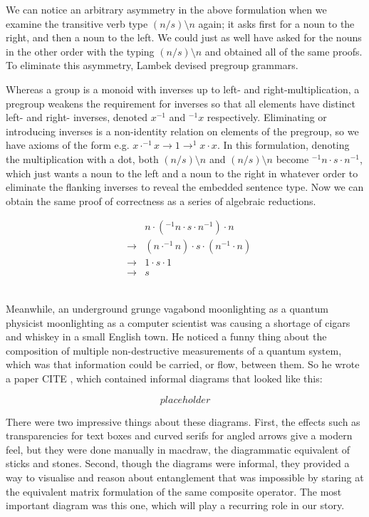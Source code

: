 \begin{fullwidth}
We can notice an arbitrary asymmetry in the above formulation when we examine the transitive verb type $(n/s)\setminus n$ again; it asks first for a noun to the right, and then a noun to the left. We could just as well have asked for the nouns in the other order with the typing $(n/s)\setminus n$ and obtained all of the same proofs. To eliminate this asymmetry, Lambek devised pregroup grammars.

Whereas a group is a monoid with inverses up to left- and right-multiplication, a pregroup weakens the requirement for inverses so that all elements have distinct left- and right- inverses, denoted $x^{-1}$ and $^{-1}x$ respectively. Eliminating or introducing inverses is a non-identity relation on elements of the pregroup, so we have axioms of the form e.g. $x \cdot ^{-1}x \rightarrow 1 \rightarrow ^{1}x \cdot x$. In this formulation, denoting the multiplication with a dot, both $(n/s)\setminus n$ and $(n/s)\setminus n$ become $^{-1}n \cdot s \cdot n^{-1}$, which just wants a noun to the left and a noun to the right in whatever order to eliminate the flanking inverses to reveal the embedded sentence type. Now we can obtain the same proof of correctness as a series of algebraic reductions.

\begin{align}
& &n \cdot (^{-1}n \cdot s \cdot n^{-1}) \cdot n\\
&\rightarrow &(n \cdot ^{-1}n) \cdot s \cdot (n^{-1} \cdot n)\\
&\rightarrow & 1 \cdot s \cdot 1\\
&\rightarrow & s
\end{align}

\\

Meanwhile, an underground grunge vagabond moonlighting as a quantum physicist moonlighting as a computer scientist was causing a shortage of cigars and whiskey in a small English town. He noticed a funny thing about the composition of multiple non-destructive measurements of a quantum system, which was that information could be carried, or flow, between them. So he wrote a paper \bR CITE \e, which contained informal diagrams that looked like this:

\[placeholder\]

There were two impressive things about these diagrams. First, the effects such as transparencies for text boxes and curved serifs for angled arrows give a modern feel, but they were done manually in macdraw, the diagrammatic equivalent of sticks and stones. Second, though the diagrams were informal, they provided a way to visualise and reason about entanglement that was impossible by staring at the equivalent matrix formulation of the same composite operator. The most important diagram was this one, which will play a recurring role in our story.


\end{fullwidth}

